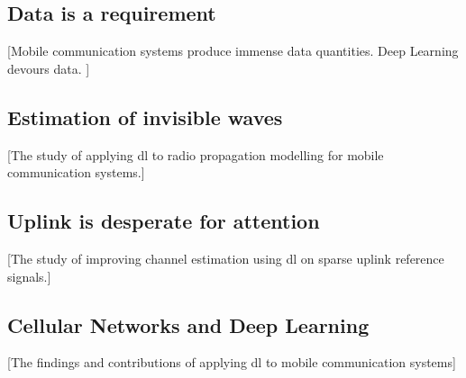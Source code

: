 \documentclass[nobib, b5paper]{tufte-book}
\begin{document}
\begin{fullwidth}
\part{Data is a requirement}[\footnotesize{Mobile communication systems produce immense data quantities. Deep Learning devours data. }]
\end{fullwidth}



\begin{fullwidth}
\part{Estimation of invisible waves}[\footnotesize{The study of applying \acrlong{dl} to radio propagation modelling for mobile communication systems.}]
\end{fullwidth}




\begin{fullwidth}
\part{Uplink is desperate for attention}[\footnotesize{The study of improving channel estimation using \acrlong{dl} on sparse uplink reference signals.}]
\end{fullwidth}



\begin{fullwidth}
\part{Cellular Networks and Deep Learning}[\footnotesize{The findings and contributions of applying \acrlong{dl} to mobile communication systems}]
\end{fullwidth}




{\footnotesize
\printbibliography[heading=bibintoc]}
\end{document}
